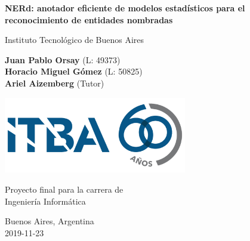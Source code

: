 \begin{titlepage}
    \begin{center}
        \vspace*{1cm}

        \Huge
        \textbf{NERd: anotador eficiente de modelos estadísticos para el reconocimiento de entidades nombradas}

        \vspace{0.5cm}
        \LARGE
        Instituto Tecnológico de Buenos Aires

        \vspace{1.5cm}

        \textbf{Juan Pablo Orsay} (L: 49373)\\
        \textbf{Horacio Miguel Gómez} (L: 50825)\\
        \textbf{Ariel Aizemberg} (Tutor)

        \vfill

        \includegraphics[width=0.6\textwidth]{assets/logoItba}

        \vspace{0.8cm}

        Proyecto final para la carrera de\\
        Ingeniería Informática

        \vspace{0.8cm}

        \Large
        Buenos Aires, Argentina\\
        2019-11-23

    \end{center}
\end{titlepage}

\let\maketitle\oldmaketitle
